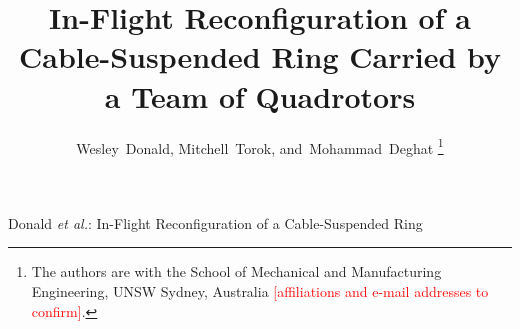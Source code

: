 \documentclass[journal]{IEEEtran}
\newcommand{\placeholder}[1]{\textcolor{red}{[#1]}}
\begin{document}
\title{In-Flight Reconfiguration of a Cable-Suspended Ring Carried by a Team of Quadrotors}

\author{Wesley~Donald, Mitchell~Torok, and~Mohammad~Deghat%
\thanks{The authors are with the School of Mechanical and Manufacturing Engineering, UNSW Sydney, Australia
\placeholder{affiliations and e-mail addresses to confirm}.}}

%
{Donald \MakeLowercase{\textit{et al.}}: In-Flight Reconfiguration of a Cable-Suspended Ring}

\maketitle













\end{document}

